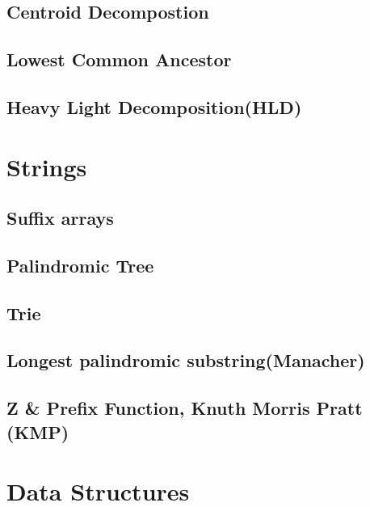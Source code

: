 \documentclass[12pt]{extarticle}
\begin{document}
\begin{multicols*}{2}
\subsection{Centroid Decompostion}


\subsection{Lowest Common Ancestor}


\subsection{Heavy Light Decomposition(HLD)}



\section{Strings}

\subsection{Suffix arrays} %


\subsection{Palindromic Tree} %


\subsection{Trie} %


\subsection{Longest palindromic substring(Manacher)} %


\subsection{Z \& Prefix Function, Knuth Morris Pratt (KMP)} %


\section{Data Structures}


\end{multicols*}
\end{document}

